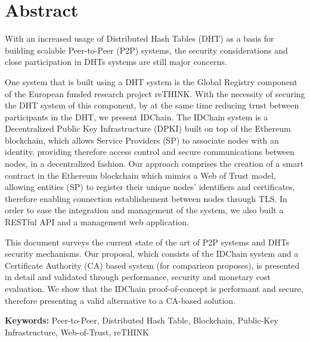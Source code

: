 \chapter*{Abstract}


With an increased usage of Distributed Hash Tables (DHT) as a basis for building scalable Peer-to-Peer (P2P) systems, the security considerations and close participation in DHTs systems are still major concerns.

One system that is built using a DHT system is the Global Registry component of the European funded research project reTHINK.
With the necessity of securing the DHT system of this component, by at the same time reducing trust between participants in the DHT, we present IDChain.
The IDChain system is a Decentralized Public Key Infrastructure (DPKI) built on top of the Ethereum blockchain, which allows Service Providers (SP) to associate nodes with an identity, providing therefore access control and secure communications between nodes, in a decentralized fashion.
Our approach comprises the creation of a smart contract in the Ethereum blockchain which mimics a Web of Trust model, allowing entities (SP) to register their unique nodes' identifiers and certificates, therefore enabling connection establishement between nodes through TLS.
In order to ease the integration and management of the system, we also built a RESTful API and a management web application.

This document surveys the current state of the art of P2P systems and DHTs security mechanisms. Our proposal, which consists of the IDChain system and a Certificate Authority (CA) based system (for comparison proposes), is presented in detail and validated through performance, security and monetary cost evaluation.
We show that the IDChain proof-of-concept is performant and secure, therefore presenting a valid alternative to a CA-based solution.

\vspace{1cm}

\textbf{\Large Keywords:} Peer-to-Peer, Distributed Hash Table, Blockchain, Public-Key Infrastructure, Web-of-Trust, reTHINK

\cleardoublepage
